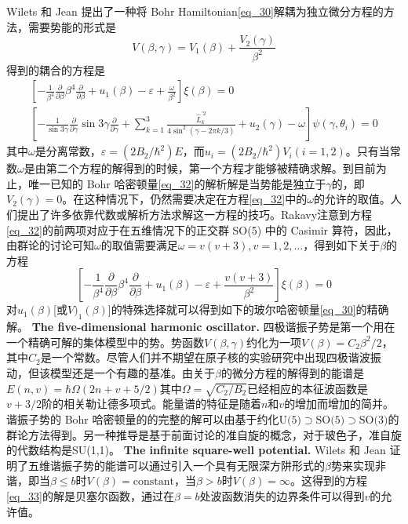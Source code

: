 Wilets 和 Jean 提出了一种将 Bohr Hamiltonian\ref{eq_30}解耦为独立微分方程的方法，需要势能的形式是
\begin{equation}
V(\beta,\gamma)=V_1(\beta)+\frac{V_2(\gamma)}{\beta^2}
\end{equation}
得到的耦合的方程是
\begin{equation}\label{eq_32}
\begin{array}{l}
\left[-\frac{1}{\beta^4}\frac{\partial}{\partial\beta}\beta^4\frac{\partial}{\partial\beta}+u_1(\beta)-\varepsilon+\frac{\omega}{\beta^2}\right]\xi(\beta)=0\\[1.5ex]
\left[-\frac{1}{\sin3\gamma}\frac{\partial}{\partial\gamma}\sin3\gamma\frac{\partial}{\partial\gamma}+\sum_{k=1}^3\frac{\hat{L}^{\prime2}_k}{4\sin^2(\gamma-2\pi k/3)}+u_2(\gamma)-\omega\right]\psi(\gamma,\theta_i)=0
\end{array}
\end{equation}
其中$\omega$是分离常数，$\varepsilon=(2B_2/\hbar^2)E$，而$u_i=(2B_2/\hbar^2)V_i(i=1,2)$。只有当常数$\omega$是由第二个方程的解得到的时候，第一个方程才能够被精确求解。到目前为止，唯一已知的 Bohr 哈密顿量\ref{eq_32}的解析解是当势能是独立于$\gamma$的，即$V_2(\gamma)=0$。在这种情况下，仍然需要决定在方程\ref{eq_32}中的$\omega$的允许的取值。人们提出了许多依靠代数或解析方法求解这一方程的技巧。Rakavy注意到方程\ref{eq_32}的前两项对应于在五维情况下的正交群 SO(5) 中的 Casimir 算符，因此，由群论的讨论可知$\omega$的取值需要满足$\omega=v(v+3), v=1,2,\ldots$，得到如下关于$\beta$的方程
\begin{equation}\label{eq_33}
\left[-\frac{1}{\beta^4}\frac{\partial}{\partial\beta}\beta^4\frac{\partial}{\partial\beta}+u_1(\beta)-\varepsilon+\frac{v(v+3)}{\beta^2}\right]\xi(\beta)=0
\end{equation}
对$u_1(\beta)$[或$V)_1(\beta)$]的特殊选择就可以得到如下的玻尔哈密顿量\ref{eq_30}的精确解。
\vskip 0.6cm
\noindent\textbf{\large The five-dimensional harmonic oscillator.}
\vskip 0.3cm
四极谐振子势是第一个用在一个精确可解的集体模型中的势。势函数$V(\beta,\gamma)$约化为一项$V(\beta)=C_2\beta^2/2$，其中$C_2$是一个常数。尽管人们并不期望在原子核的实验研究中出现四极谐波振动，但该模型还是一个有趣的基准。由关于$\beta$的微分方程的解得到的能谱是$E(n,v)=\hbar\Omega(2n+v+5/2)$其中$\Omega=\sqrt{C_2/B_2}$已经相应的本征波函数是$v+3/2$阶的相关勒让德多项式。能量谱的特征是随着$n$和$v$的增加而增加的简并。谐振子势的 Bohr 哈密顿量的的完整的解可以由基于约化$\textrm{U(5)}\supset\textrm{SO(5)}\supset\textrm{SO(3)}$的群论方法得到。另一种推导是基于前面讨论的准自旋的概念，对于玻色子，准自旋的代数结构是SU(1,1)。
\vskip 0.6cm
\noindent\textbf{\large The infinite square-well potential.}
\vskip 0.3cm
Wilets 和 Jean 证明了五维谐振子势的能谱可以通过引入一个具有无限深方阱形式的$\beta$势来实现非谐，即当$\beta\le b$时$V(\beta)=\textrm{constant}$，当$\beta>b$时$V(\beta)=\infty$。这得到的方程\ref{eq_33}的解是贝塞尔函数，通过在$\beta=b$处波函数消失的边界条件可以得到$v$的允许值。

